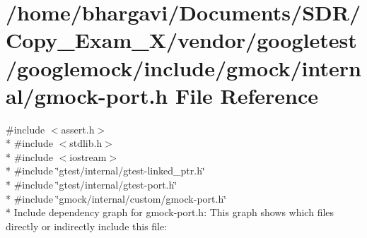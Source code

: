 \hypertarget{gmock-port_8h}{}\section{/home/bhargavi/\+Documents/\+S\+D\+R/\+Copy\+\_\+\+Exam\+\_\+X/vendor/googletest/googlemock/include/gmock/internal/gmock-\/port.h File Reference}
\label{gmock-port_8h}
{\ttfamily \#include $<$assert.\+h$>$}\\*
{\ttfamily \#include $<$stdlib.\+h$>$}\\*
{\ttfamily \#include $<$iostream$>$}\\*
{\ttfamily \#include \char`\"{}gtest/internal/gtest-\/linked\+\_\+ptr.\+h\char`\"{}}\\*
{\ttfamily \#include \char`\"{}gtest/internal/gtest-\/port.\+h\char`\"{}}\\*
{\ttfamily \#include \char`\"{}gmock/internal/custom/gmock-\/port.\+h\char`\"{}}\\*
Include dependency graph for gmock-\/port.h\+:
This graph shows which files directly or indirectly include this file\+:
